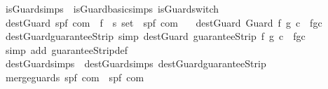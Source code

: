 \begin{isabellebody}
\endisatagproof
{\isafoldproof}%
%
\isadelimproof
\isanewline
%
\endisadelimproof
\isanewline
{}\isamarkupfalse%
\ is{\isacharunderscore}Guard{\isacharunderscore}simps\ {\isacharequal}\ is{\isacharunderscore}Guard{\isacharunderscore}basic{\isacharunderscore}simps\ is{\isacharunderscore}Guard{\isacharunderscore}switch\isanewline
\isanewline
{}\isamarkupfalse%
\ dest{\isacharunderscore}Guard{\isacharcolon}{\isacharcolon}\ {\isachardoublequoteopen}{\isacharparenleft}{\isacharprime}s{\isacharcomma}{\isacharprime}p{\isacharcomma}{\isacharprime}f{\isacharparenright}\ com\ {\isasymRightarrow}\ {\isacharparenleft}{\isacharprime}f\ {\isasymtimes}\ {\isacharprime}s\ set\ {\isasymtimes}\ {\isacharparenleft}{\isacharprime}s{\isacharcomma}{\isacharprime}p{\isacharcomma}{\isacharprime}f{\isacharparenright}\ com{\isacharparenright}{\isachardoublequoteclose}\isanewline
\ \ \ {\isachardoublequoteopen}dest{\isacharunderscore}Guard\ {\isacharparenleft}Guard\ f\ g\ c{\isacharparenright}\ {\isacharequal}\ {\isacharparenleft}f{\isacharcomma}g{\isacharcomma}c{\isacharparenright}{\isachardoublequoteclose}\isanewline
\isanewline
{}\isamarkupfalse%
\ dest{\isacharunderscore}Guard{\isacharunderscore}guaranteeStrip\ {\isacharbrackleft}simp{\isacharbrackright}{\isacharcolon}\ {\isachardoublequoteopen}dest{\isacharunderscore}Guard\ {\isacharparenleft}guaranteeStrip\ f\ g\ c{\isacharparenright}\ {\isacharequal}\ {\isacharparenleft}f{\isacharcomma}g{\isacharcomma}c{\isacharparenright}{\isachardoublequoteclose}\isanewline
%
\isadelimproof
\ \ %
\endisadelimproof
%
\isatagproof
{}\isamarkupfalse%
\ {\isacharparenleft}simp\ add{\isacharcolon}\ guaranteeStrip{\isacharunderscore}def{\isacharparenright}%
\endisatagproof
{\isafoldproof}%
%
\isadelimproof
\isanewline
%
\endisadelimproof
\isanewline
{}\isamarkupfalse%
\ dest{\isacharunderscore}Guard{\isacharunderscore}simps\ {\isacharequal}\ dest{\isacharunderscore}Guard{\isachardot}simps\ dest{\isacharunderscore}Guard{\isacharunderscore}guaranteeStrip%
\isamarkuptrue%
\isamarkupfalse%
\ merge{\isacharunderscore}guards{\isacharcolon}{\isacharcolon}\ {\isachardoublequoteopen}{\isacharparenleft}{\isacharprime}s{\isacharcomma}{\isacharprime}p{\isacharcomma}{\isacharprime}f{\isacharparenright}\ com\ {\isasymRightarrow}\ {\isacharparenleft}{\isacharprime}s{\isacharcomma}{\isacharprime}p{\isacharcomma}{\isacharprime}f{\isacharparenright}\ com{\isachardoublequoteclose}\isanewline

\end{isabellebody}
